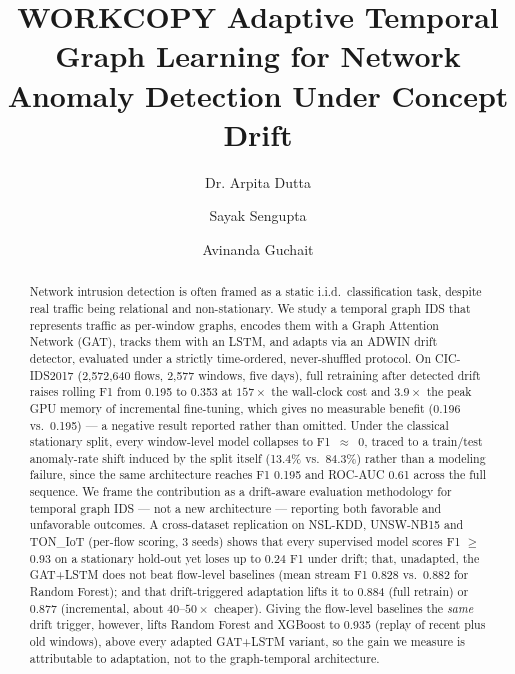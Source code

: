 \documentclass[twocolumn]{llncs}
\begin{document}
\title{WORKCOPY Adaptive Temporal Graph Learning for Network Anomaly Detection Under Concept Drift}

\author{Dr. Arpita Dutta \and Sayak Sengupta \and Avinanda Guchait}


\maketitle

\begin{abstract}
Network intrusion detection is often framed as a static i.i.d.\ classification task, despite real traffic being relational and non-stationary. We study a temporal graph {\color{red}IDS} that represents traffic as per-window graphs, encodes them with a Graph Attention Network (GAT), tracks them with an LSTM, and adapts via an ADWIN drift detector, evaluated under a strictly time-ordered, never-shuffled protocol. {\color{red}On CIC-IDS2017 (2{,}572{,}640 flows, 2{,}577 windows, five days), full retraining after detected drift raises rolling F1 from 0.195 to 0.353 at $157\times$ the wall-clock cost and $3.9\times$ the peak GPU memory of incremental fine-tuning, which gives no measurable benefit (0.196 vs.\ 0.195) --- a negative result reported rather than omitted. Under the classical stationary split, every window-level model collapses to F1~$\approx$~0, traced to a train/test anomaly-rate shift induced by the split itself (13.4\% vs.\ 84.3\%) rather than a modeling failure, since the same architecture reaches F1 0.195 and ROC-AUC 0.61 across the full sequence. We frame the contribution as a drift-aware evaluation methodology for temporal graph IDS --- not a new architecture --- reporting both favorable and unfavorable outcomes.} {\color{red}A cross-dataset replication on NSL-KDD, UNSW-NB15 and TON\_IoT (per-flow scoring, 3 seeds) shows that every supervised model scores F1 $\ge$ 0.93 on a stationary hold-out yet loses up to 0.24 F1 under drift; that, unadapted, the GAT+LSTM does not beat flow-level baselines (mean stream F1 0.828 vs.\ 0.882 for Random Forest); and that drift-triggered adaptation lifts it to 0.884 (full retrain) or 0.877 (incremental, about $40$--$50\times$ cheaper). Giving the flow-level baselines the \emph{same} drift trigger, however, lifts Random Forest and XGBoost to 0.935 (replay of recent plus old windows), above every adapted GAT+LSTM variant, so the gain we measure is attributable to adaptation, not to the graph-temporal architecture.}

\end{abstract}
\end{document}
